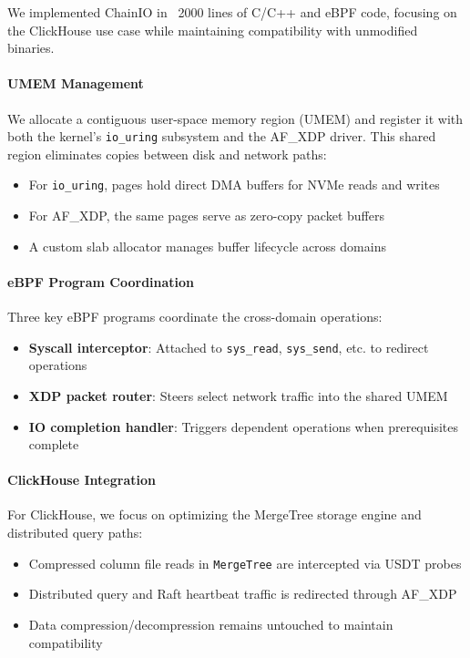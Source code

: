 \documentclass[sigconf,10pt]{acmart}
\newcommand{\sys}{ChainIO\xspace}
\begin{document}
We implemented \sys in ~2000 lines of C/C++ and eBPF code, focusing on the ClickHouse use case while maintaining compatibility with unmodified binaries.

\paragraph{UMEM Management}
We allocate a contiguous user-space memory region (UMEM) and register it with both the kernel's \texttt{io\_uring} subsystem and the AF\_XDP driver. This shared region eliminates copies between disk and network paths:

\begin{itemize}[leftmargin=*,itemsep=0pt]
  \item For \texttt{io\_uring}, pages hold direct DMA buffers for NVMe reads and writes
  \item For AF\_XDP, the same pages serve as zero-copy packet buffers
  \item A custom slab allocator manages buffer lifecycle across domains
\end{itemize}

\paragraph{eBPF Program Coordination}
Three key eBPF programs coordinate the cross-domain operations:

\begin{itemize}[leftmargin=*,itemsep=0pt]
  \item \textbf{Syscall interceptor}: Attached to \texttt{sys\_read}, \texttt{sys\_send}, etc. to redirect operations
  \item \textbf{XDP packet router}: Steers select network traffic into the shared UMEM
  \item \textbf{IO completion handler}: Triggers dependent operations when prerequisites complete
\end{itemize}

\paragraph{ClickHouse Integration}
For ClickHouse, we focus on optimizing the MergeTree storage engine and distributed query paths:

\begin{itemize}[leftmargin=*,itemsep=0pt]
  \item Compressed column file reads in \texttt{MergeTree} are intercepted via USDT probes
  \item Distributed query and Raft heartbeat traffic is redirected through AF\_XDP
  \item Data compression/decompression remains untouched to maintain compatibility
\end{itemize}
\end{document}
